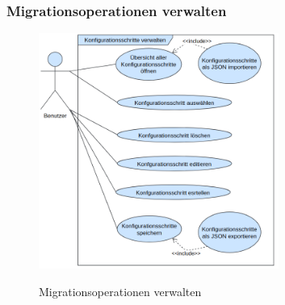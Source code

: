 \subsubsection{Migrationsoperationen verwalten}
\begin{figure}[H]
	\caption{Migrationsoperationen verwalten}
	\centering
	\includegraphics[width=0.7\textwidth]{images/af/af-ks-verwalten}
	\label{img:af-ks-verwalten}
\end{figure}

